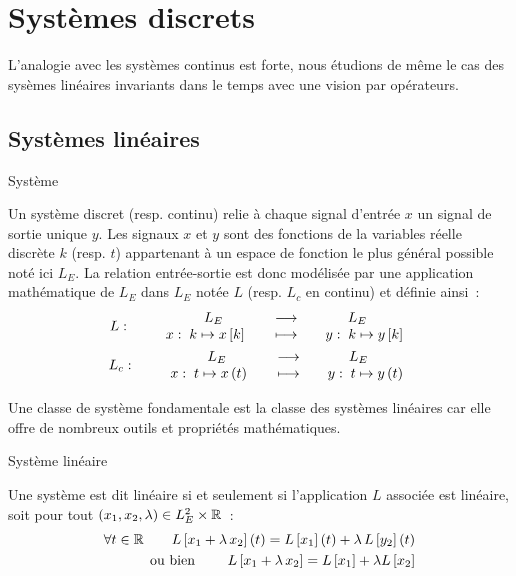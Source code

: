 \chapter{Systèmes discrets}


L'analogie avec les systèmes continus est forte, nous étudions de même
le cas des sysèmes linéaires invariants dans le temps avec une vision
par opérateurs.


\section{Systèmes linéaires}

\begin{definition}{Système}

Un système discret (resp. continu) relie à chaque signal d'entrée $x$
un signal de sortie unique $y$. Les signaux $x$ et $y$ sont des
fonctions de la variables réelle discrète $k$ (resp. $t$) appartenant
à un espace de fonction le plus général possible noté ici $L_E$. La
relation entrée-sortie est donc modélisée par une application
mathématique de $L_E$ dans $L_E$ notée $L$ (resp. $L_c$ en continu) et
définie ainsi~:
\begin{eqnarray}
  L : \qquad \begin{array}{ccc} L_E & \longrightarrow & L_E \\ x : \; k\mapsto x\left[k\right]\quad{} & \longmapsto & \quad y :\; k\mapsto y\left[k\right] \\ \end{array} \\
  L_c: \qquad \begin{array}{ccc} L_E & \longrightarrow & L_E \\ x : \; t\mapsto x\left(t\right)\quad{} & \longmapsto & \quad y :\; t\mapsto y\left(t\right) \\ \end{array} 
\end{eqnarray}
\end{definition}

Une classe de système fondamentale est la classe des systèmes
linéaires car elle offre de nombreux outils et propriétés
mathématiques.

\begin{definition}{Système linéaire}
  \label{def:linearite}
  
  Une système est dit linéaire si et seulement si
  l'application $L$ associée est linéaire, soit pour tout
  $\left(x_1,x_2,\lambda\right) \in L_E^2 \times \mathbb{R}$~:
  \begin{eqnarray}
    \label{eq:def_linearite}
    \forall t \in \mathbb{R} \qquad L\left[x_1 + \lambda\, x_2\right](t) = L\left[x_1\right](t) + \lambda\,L\left[y_2\right](t) \nonumber\\
    \text{ou bien } \qquad L\left[x_1 + \lambda\,x_2\right] = L\left[x_1\right] +\lambda L\left[x_2 \right]
  \end{eqnarray}
\end{definition}

